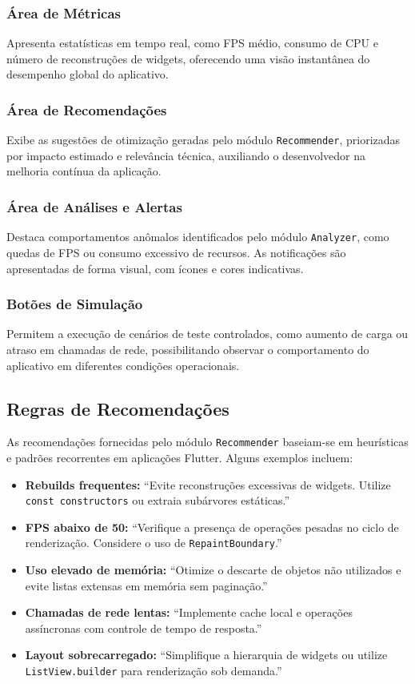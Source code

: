 \documentclass[12pt,a4paper,oneside]{abntex2}
\begin{document}
\subsubsection{Área de Métricas}
Apresenta estatísticas em tempo real, como FPS médio, consumo de CPU e número de reconstruções de widgets, oferecendo uma visão instantânea do desempenho global do aplicativo.

\subsubsection{Área de Recomendações}
Exibe as sugestões de otimização geradas pelo módulo \texttt{Recommender}, priorizadas por impacto estimado e relevância técnica, auxiliando o desenvolvedor na melhoria contínua da aplicação.

\subsubsection{Área de Análises e Alertas}
Destaca comportamentos anômalos identificados pelo módulo \texttt{Analyzer}, como quedas de FPS ou consumo excessivo de recursos. As notificações são apresentadas de forma visual, com ícones e cores indicativas.

\subsubsection{Botões de Simulação}
Permitem a execução de cenários de teste controlados, como aumento de carga ou atraso em chamadas de rede, possibilitando observar o comportamento do aplicativo em diferentes condições operacionais.

\subsection{Regras de Recomendações}

As recomendações fornecidas pelo módulo \texttt{Recommender} baseiam-se em heurísticas e padrões recorrentes em aplicações Flutter. Alguns exemplos incluem:

\begin{itemize}
  \item \textbf{Rebuilds frequentes:} “Evite reconstruções excessivas de widgets. Utilize \texttt{const constructors} ou extraia subárvores estáticas.”
  \item \textbf{FPS abaixo de 50:} “Verifique a presença de operações pesadas no ciclo de renderização. Considere o uso de \texttt{RepaintBoundary}.”
  \item \textbf{Uso elevado de memória:} “Otimize o descarte de objetos não utilizados e evite listas extensas em memória sem paginação.”
  \item \textbf{Chamadas de rede lentas:} “Implemente cache local e operações assíncronas com controle de tempo de resposta.”
  \item \textbf{Layout sobrecarregado:} “Simplifique a hierarquia de widgets ou utilize \texttt{ListView.builder} para renderização sob demanda.”
\end{itemize}
\end{document}
